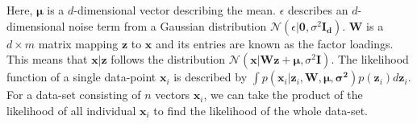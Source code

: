 Here, $\bm{\mu}$ is a $d$-dimensional vector describing the mean. $\epsilon$ describes an $d$-dimensional noise term from a Gaussian distribution $\mathcal{N}(\epsilon|\bm{0},\sigma^2 \bm{I_d})$. $\bm{W}$ is a $d\times m$ matrix mapping $\bm{z}$ to $\bm{x}$ and its entries are known as the factor loadings. This means that $\bm{x}|\bm{z}$ follows the distribution $\mathcal{N}(\bm{x}|\bm{Wz}+\bm{\mu}, \sigma^2\bm{I})$. The likelihood function of a single data-point $\bm{x}_i$ is described by $\int p(\bm{x}_i|\bm{z}_i, \bm{W}, \bm{\mu}, \bm{\sigma^2})p(\bm{z}_i) d\bm{z}_i$. For a data-set consisting of $n$ vectors $\bm{x}_i$, we can take the product of the likelihood of all individual $\bm{x}_i$ to find the likelihood of the whole data-set.


 
 
 
